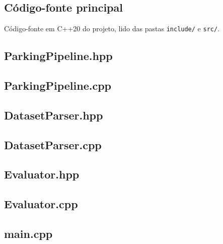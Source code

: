 \documentclass[
	article,			%
	11pt,				%
	oneside,			%
	a4paper,			%
	english,			%
	brazil,				%
	sumario=tradicional
	]{abntex2}
\begin{document}
\begin{apendicesenv}
\chapter{Código-fonte principal}
Código-fonte em C++20 do projeto, lido das pastas \texttt{include/} e \texttt{src/}.

\section*{ParkingPipeline.hpp}

\section*{ParkingPipeline.cpp}

\section*{DatasetParser.hpp}

\section*{DatasetParser.cpp}

\section*{Evaluator.hpp}

\section*{Evaluator.cpp}

\section*{main.cpp}

\end{apendicesenv}
\end{document}
